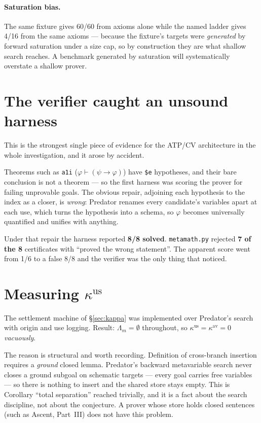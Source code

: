 \documentclass[11pt,a4paper]{article}
\begin{document}
\paragraph{Saturation bias.} The same fixture gives 60/60 from axioms alone
while the named ladder gives 4/16 from the same axioms --- because the fixture's
targets were \emph{generated} by forward saturation under a size cap, so by
construction they are what shallow search reaches. A benchmark generated by
saturation will systematically overstate a shallow prover.

\section{The verifier caught an unsound harness}\label{sec:cvcatch}

This is the strongest single piece of evidence for the ATP/CV architecture in
the whole investigation, and it arose by accident.

Theorems such as \texttt{a1i} ($\varphi \vdash (\psi \to \varphi)$) have
\texttt{\$e} hypotheses, and their bare conclusion is not a theorem --- so the
first harness was scoring the prover for failing unprovable goals. The obvious
repair, adjoining each hypothesis to the index as a closer, is \emph{wrong}:
Predator renames every candidate's variables apart at each use, which turns the
hypothesis into a schema, so $\varphi$ becomes universally quantified and
unifies with anything.

Under that repair the harness reported \textbf{8/8 solved}. \texttt{metamath.py}
rejected \textbf{7 of the 8} certificates with ``proved the wrong statement''.
The apparent score went from 1/6 to a false 8/8 and the verifier was the only
thing that noticed.

\section{Measuring $\kappa^{\mathrm{us}}$}

The settlement machine of \S\ref{sec:kappa} was implemented over Predator's
search with origin and use logging. Result: $\Lambda_m = \emptyset$ throughout,
so $\kappa^{\mathrm{us}} = \kappa^{\mathrm{av}} = 0$ \emph{vacuously}.

The reason is structural and worth recording. Definition of cross-branch
insertion requires a \emph{ground} closed lemma. Predator's backward
metavariable search never closes a ground subgoal on schematic targets --- every
goal carries free variables --- so there is nothing to insert and the shared
store stays empty. This is Corollary ``total separation'' reached trivially,
and it is a fact about the search discipline, not about the conjecture. A
prover whose store holds closed sentences (such as Ascent, Part~III) does not
have this problem.
\end{document}

